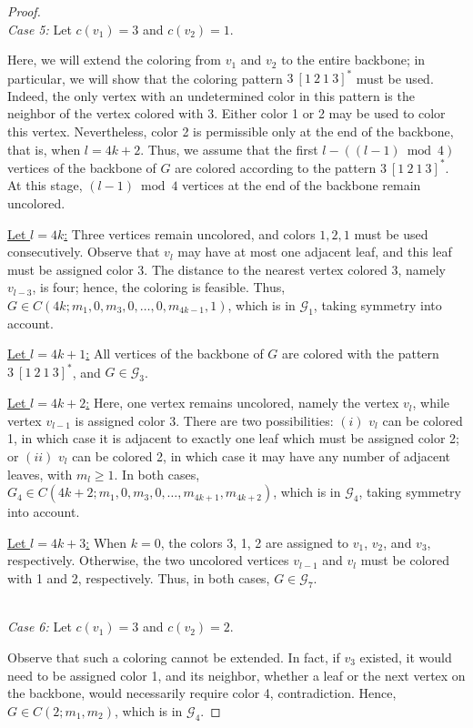 \documentclass{article}
\begin{document}
\begin{proof}
~~\\
\emph{Case 5:} Let $c(v_1)=3$ and $c(v_2)=1$. 

Here, we will extend the coloring from $v_1$ and $v_2$ to the entire backbone; in particular, we will show that the coloring pattern $3\ [1\ 2\ 1\ 3]^*$ must be used. Indeed, the only vertex with an undetermined color in this pattern is the neighbor of the vertex colored with 3. Either color 1 or 2 may be used to color this vertex. Nevertheless, color 2 is permissible only at the end of the backbone, that is, when $l=4k+2$. Thus, we assume that the first $l-((l-1) \bmod 4)$ vertices of the backbone of $G$ are colored according to the pattern $3\ [1\ 2\ 1\ 3]^*$. At this stage, $(l-1)\bmod 4$ vertices at the end of the backbone remain uncolored.

\underline{Let $l=4k$:} 
Three vertices remain uncolored, and colors $1,2,1$ must be used consecutively. Observe that $v_l$ may have at most one adjacent leaf, and this leaf must be assigned color 3. The distance to the nearest vertex colored  3, namely $v_{l-3}$, is four; hence, the coloring is feasible. Thus, $G \in C(4k;m_1,0,m_3,0, \ldots, 0, m_{4k-1},1)$, which is in $\mathcal{G}_1$, taking symmetry into account.

\underline{Let $l=4k+1$:} 
All vertices of the backbone of $G$ are colored with the pattern $3\ [1\ 2\ 1\ 3]^*$, and $G \in \mathcal{G}_3$.

\underline{Let $l=4k+2$:} 
Here, one vertex remains uncolored, namely the vertex $v_l$, while vertex $v_{l-1}$ is assigned color 3. There are two possibilities: $(i)$ $v_l$ can be colored 1, in which case it is adjacent to exactly one leaf which must be assigned color 2; or $(ii)$ $v_l$ can be colored 2, in which case it may have any number of adjacent leaves, with $m_l \geq 1$. In both cases, $G_4\in C(4k+2; m_1,0,m_3,0,\ldots,m_{4k+1},m_{4k+2})$, which is in $\mathcal{G}_4$, taking symmetry into account.

\underline{Let $l=4k+3$:} When $k=0$, the colors 3, 1, 2 are assigned to $v_1$, $v_2$, and $v_3$, respectively. Otherwise, the two uncolored vertices $v_{l-1}$ and $v_l$ must be colored with 1 and 2, respectively. Thus, in both cases, $G \in \mathcal{G}_7$.

~~\\
\emph{Case 6:} Let $c(v_1)=3$ and $c(v_2)=2$. 

Observe that such a coloring cannot be extended. In fact, if $v_3$ existed, it would need to be assigned color 1, and its neighbor, whether a leaf or the next vertex on the backbone, would necessarily require color 4, contradiction. 
Hence, $G\in C(2; m_1,m_2)$, which is in $\mathcal{G}_4$.


\end{proof}
\end{document}
